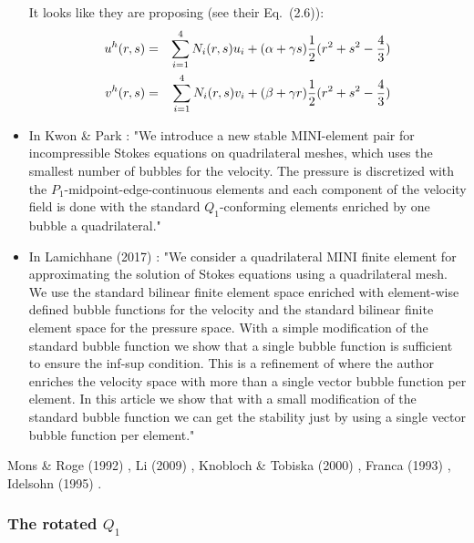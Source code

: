 \begin{itemize}
It looks like they are proposing (see their Eq.~(2.6)):
\begin{eqnarray}
u^h(r,s) &=& \sum_{i=1}^4 N_i (r,s) u_i + (\alpha + \gamma s)\frac{1}{2}(r^2+s^2-\frac43) \nonumber\\ 
v^h(r,s) &=& \sum_{i=1}^4 N_i (r,s) v_i + (\beta + \gamma r) \frac{1}{2}(r^2+s^2-\frac43)  
\end{eqnarray}

\item In Kwon \& Park \cite{kwpa14}: 
"We introduce a new stable MINI-element pair for incompressible Stokes equations on
quadrilateral meshes, which uses the smallest number of bubbles for the velocity. The pressure is 
discretized with the $P_1$-midpoint-edge-continuous elements and each component of the velocity field is
done with the standard $Q_1$-conforming elements enriched by one bubble a quadrilateral."

\item  In Lamichhane (2017) \cite{lami17}: "We consider a quadrilateral MINI
finite element for approximating the solution
of Stokes equations using a quadrilateral mesh. We use the standard bilinear finite
element space enriched with element-wise defined bubble functions for the velocity
and the standard bilinear finite element space for the pressure space. With a simple
modification of the standard bubble function we show that a single bubble function is
sufficient to ensure the inf-sup condition.
This is a refinement of \cite{bai97} where the author enriches the velocity space with
more than a single vector bubble function per element. In this article we show that 
with a small modification of the standard bubble function we can get the stability just 
by using a single vector bubble function per element."



\end{itemize}


\Literature Mons \& Roge (1992) \cite{moro92}, 
Li \etal (2009) \cite{lihc09}, Knobloch \& Tobiska (2000) \cite{knto00}, 
Franca \etal (1993) \cite{frha93}, Idelsohn \etal (1995) \cite{idsn95}.





\newpage
\subsubsection{The rotated $Q_1$} \label{ss:rq1}

